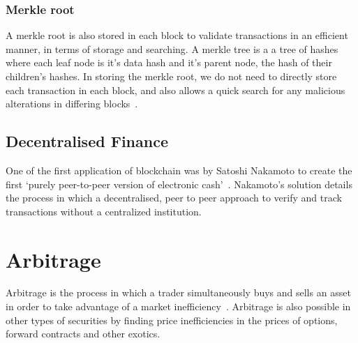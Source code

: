 \subsubsection{Merkle root}
A merkle root is also stored in each block to validate transactions in an efficient manner, in terms of storage and searching. A merkle tree is a a tree of hashes where each leaf node is it's data hash and it's parent node, the hash of their children's hashes. In storing the merkle root, we do not need to directly store each transaction in each block, and also allows a quick search for any malicious alterations in differing blocks~\cite{noauthor_merkle_nodate}.

\subsection{Decentralised Finance}
One of the first application of blockchain was by Satoshi Nakamoto to create the first `purely peer-to-peer version of electronic cash'~\cite{nakamoto2009bitcoin}. Nakamoto's solution details the process in which a decentralised, peer to peer approach to verify and track transactions without a centralized institution.


\section{Arbitrage}
Arbitrage is the process in which a trader simultaneously buys and sells an asset in order to take advantage of a market inefficiency~\cite{businessinsightsblog_2021}. Arbitrage is also possible in other types of securities by finding price inefficiencies in the prices of options, forward contracts and other exotics.


